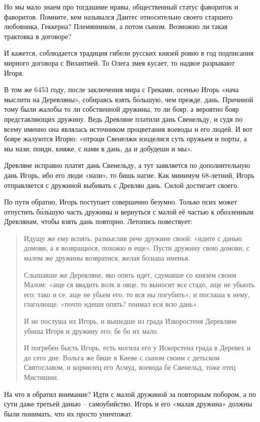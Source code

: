 Но мы мало знаем про тогдашние нравы, общественный статус фавориток и фаворитов. Помните, кем назывался Дантес относительно своего старшего любовника, Геккерна? Племянником, а потом сыном. Возможно ли такая трактовка в договоре? 

И кажется, соблюдается традиция гибели русских князей ровно в год подписания мирного договора с Византией. То Олега змея кусает, то надвое разрывают Игоря.

В том же 6453 году, после заключения мира с Греками, осенью Игорь «нача мыслити на Деревляны», собираясь взять б\'ольшую, чем прежде, дань. Причиной тому были жалобы то ли собственной дружины, то ли бояр, а вероятно бояр представляющих дружину. Ведь Древляне платили дань Свенельду, и судя по всему именно она являлась источником процветания воеводы и его людей. И вот бояре жалуются Игорю: «отроци Свенелжи изоделися суть оружьем и порты, а мы нази; поиди, княже, с нами в дань, да и добудеши и мы».

Древляне исправно платят дань Свенельду, а тут заявляется по дополнительную дань Игорь, ибо его люди «нази», то бишь нагие. Как минимум 68-летний, Игорь отправляется с дружиной выбивать с Древлян дань. Силой достигает своего.

По пути обратно, Игорь поступает совершенно безумно. Только псих может отпустить б\'ольшую часть дружины и вернуться с малой её частью к обозленным Древлянам, чтобы взять дань повторно. Летопись повествует:

\begin{quotation}
Идущу же ему вспять, размыслив рече дружине своей: «идите с данью домови, а я возвращюся, похожю и еще». Пусти дружину свою домови, с малом же дружины возвратися, желая больша именья.

Слышавше же Деревляне, яко опять идет, сдумавше со князем своим Малом: «аще ся ввадить волк в овце, то выносит все стадо, аще не убьють его; тако и се, аще не убьем его, то вся ны погубить»; и послаша к нему, глаголюще: «почто идеши опять? поимал еси всю дань». 

И не послуша их Игорь, и вышедше из града Изкоростеня Деревляне убиша Игоря и дружину его; бе бо их мало. 

И погребен бысть Игорь, есть могила его у Искорстена града в Деревех и до сего дне. Вольга же бяше в Киеве с сыном своим с детьском Святославом, и кормилец его Асмуд, воевода бе Свенельд, тоже отец Мистишин.
\end{quotation}

На что я обратил внимание? Идти с малой дружиной за повторным побором, а по сути даже третьей данью – самоубийство. Игорь и его «малая дружина» должны были понимать, что их просто уничтожат. 

